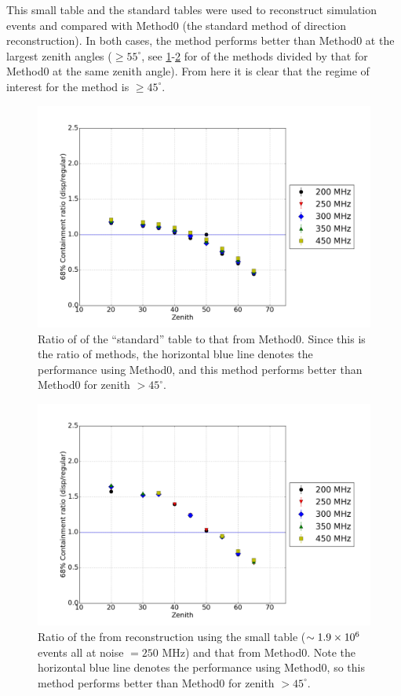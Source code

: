 \documentclass[main.tex]{subfiles}
\begin{document}
This small \disp table and the standard \disp tables were used to reconstruct simulation events and compared with Method0 (the standard method of direction reconstruction). In both cases, the \disp method performs better than Method0 at the largest zenith angles ($\geq 55^\circ$, see \ref{fig:olddisp_ratio}-\ref{fig:disp_ratio_250} for \rse of the \disp methods divided by that for Method0 at the same zenith angle). From here it is clear that the regime of interest for the \disp method is $\geq45^\circ$. 

\begin{figure}[htbp]
  \begin{center}
      \includegraphics[width=0.75\linewidth]{images/disp_standard_ratio_xzen}
      \caption[``standard'' \disp table reconstruction.]{Ratio of \rse of the ``standard'' \disp table to that from Method0. Since this is the ratio of methods, the horizontal blue line denotes the performance using Method0, and this method performs better than Method0 for zenith $>45^\circ$.}  
      \label{fig:olddisp_ratio}
  \end{center}
\end{figure}

\begin{figure}[htbp]
  \centering
  \includegraphics[width=0.75\linewidth]{images/disp_250_ratio_xzen}
  \caption[Small \disp table reconstruction (noise = $250$ MHz).]{Ratio of the \rse from reconstruction using the small \disp table ($\sim 1.9\times 10^{6}$ events all at noise $= 250$ MHz) and that from Method0. Note the horizontal blue line denotes the performance using Method0, so this method performs better than Method0 for zenith $>45^\circ$.}
  \label{fig:disp_ratio_250}
\end{figure}
\end{document}

